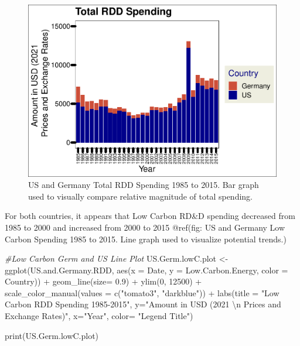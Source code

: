 \documentclass[
  12pt,
]{article}
\newenvironment{Shaded}{\begin{snugshade}}{\end{snugshade}}
\newcommand{\AttributeTok}[1]{\textcolor[rgb]{0.77,0.63,0.00}{#1}}
\newcommand{\CommentTok}[1]{\textcolor[rgb]{0.56,0.35,0.01}{\textit{#1}}}
\newcommand{\DecValTok}[1]{\textcolor[rgb]{0.00,0.00,0.81}{#1}}
\newcommand{\FloatTok}[1]{\textcolor[rgb]{0.00,0.00,0.81}{#1}}
\newcommand{\FunctionTok}[1]{\textcolor[rgb]{0.00,0.00,0.00}{#1}}
\newcommand{\NormalTok}[1]{#1}
\newcommand{\OtherTok}[1]{\textcolor[rgb]{0.56,0.35,0.01}{#1}}
\newcommand{\SpecialCharTok}[1]{\textcolor[rgb]{0.00,0.00,0.00}{#1}}
\newcommand{\StringTok}[1]{\textcolor[rgb]{0.31,0.60,0.02}{#1}}
\begin{document}
\begin{figure}
\centering
\includegraphics{Chang_Jenkins_Mullens_ENV872_Final_files/figure-latex/Germany and US Bar Plot for total budget-1.pdf}
\caption{US and Germany Total RDD Spending 1985 to 2015. Bar graph used
to visually compare relative magnitude of total spending.}
\end{figure}

For both countries, it appears that Low Carbon RD\&D spending decreased
from 1985 to 2000 and increased from 2000 to 2015 @ref(fig: US and
Germany Low Carbon Spending 1985 to 2015. Line graph used to visualize
potential trends.)

\begin{Shaded}
\begin{Highlighting}[]
\CommentTok{\#Low Carbon Germ and US Line Plot}
\NormalTok{US.Germ.lowC.plot }\OtherTok{\textless{}{-}} \FunctionTok{ggplot}\NormalTok{(US.and.Germany.RDD,}
                              \FunctionTok{aes}\NormalTok{(}\AttributeTok{x =}\NormalTok{ Date,}
                                  \AttributeTok{y =}\NormalTok{ Low.Carbon.Energy, }
                                  \AttributeTok{color =}\NormalTok{ Country)) }\SpecialCharTok{+} 
  \FunctionTok{geom\_line}\NormalTok{(}\AttributeTok{size=} \FloatTok{0.9}\NormalTok{) }\SpecialCharTok{+}
  \FunctionTok{ylim}\NormalTok{(}\DecValTok{0}\NormalTok{, }\DecValTok{12500}\NormalTok{) }\SpecialCharTok{+}
  \FunctionTok{scale\_color\_manual}\NormalTok{(}\AttributeTok{values =} \FunctionTok{c}\NormalTok{(}\StringTok{"tomato3"}\NormalTok{, }\StringTok{"darkblue"}\NormalTok{)) }\SpecialCharTok{+}
  \FunctionTok{labs}\NormalTok{(}\AttributeTok{title =} \StringTok{"Low Carbon RDD Spending 1985{-}2015"}\NormalTok{,}
       \AttributeTok{y=}\StringTok{"Amount in USD (2021 }\SpecialCharTok{\textbackslash{}n}\StringTok{ Prices and Exchange Rates)"}\NormalTok{,}
       \AttributeTok{x=}\StringTok{"Year"}\NormalTok{,}
       \AttributeTok{color=} \StringTok{"Legend Title"}\NormalTok{)}

\FunctionTok{print}\NormalTok{(US.Germ.lowC.plot)}
\end{Highlighting}
\end{Shaded}
\end{document}
